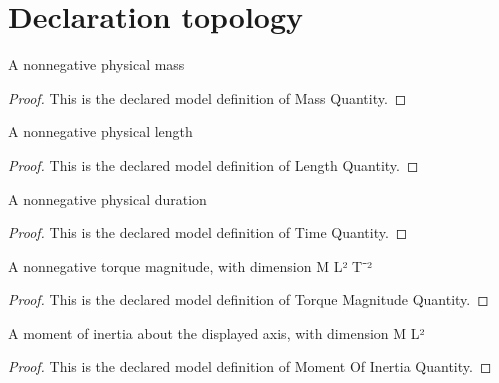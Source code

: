 \section{Declaration topology}
\begin{definition}
  \label{def:physics:phyx-mini-0704:phyxminiproblems-problemphyxmini0704-massquantity}
  A nonnegative physical mass
\end{definition}
\begin{proof}
  This is the declared model definition of Mass Quantity.
\end{proof}
\begin{definition}
  \label{def:physics:phyx-mini-0704:phyxminiproblems-problemphyxmini0704-lengthquantity}
  A nonnegative physical length
\end{definition}
\begin{proof}
  This is the declared model definition of Length Quantity.
\end{proof}
\begin{definition}
  \label{def:physics:phyx-mini-0704:phyxminiproblems-problemphyxmini0704-timequantity}
  A nonnegative physical duration
\end{definition}
\begin{proof}
  This is the declared model definition of Time Quantity.
\end{proof}
\begin{definition}
  \label{def:physics:phyx-mini-0704:phyxminiproblems-problemphyxmini0704-torquemagnitudequantity}
  A nonnegative torque magnitude, with dimension M L² T⁻²
\end{definition}
\begin{proof}
  This is the declared model definition of Torque Magnitude Quantity.
\end{proof}
\begin{definition}
  \label{def:physics:phyx-mini-0704:phyxminiproblems-problemphyxmini0704-momentofinertiaquantity}
  A moment of inertia about the displayed axis, with dimension M L²
\end{definition}
\begin{proof}
  This is the declared model definition of Moment Of Inertia Quantity.
\end{proof}
